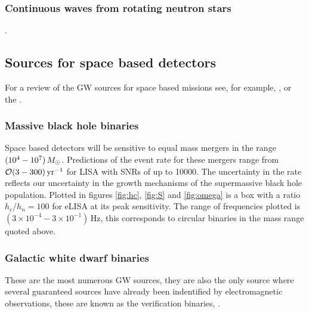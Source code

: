 \subsubsection{Continuous waves from rotating neutron stars}

{.


\subsection{Sources for space based detectors}
For a review of the GW sources for space based missions see, for example, \cite{Amaro-Seoane-et-al}, \cite{Gairetal} or the \cite{eLISAyellowbook}.


\subsubsection{Massive black hole binaries}
Space based detectors will be sensitive to equal mass mergers in the range $(10^{4}-10^{7})\,M_{ \odot }$. Predictions of the event rate for these mergers range from ${\cal{O}}(3-300)\,\textrm{yr}^{-1}$ for LISA with SNRs of up to 10000. The uncertainty in the rate reflects our uncertainty in the growth mechanisms of the supermassive black hole population. Plotted in figures \ref{fig:hc}, \ref{fig:S} and \ref{fig:omega} is a box with a ratio $h_{c}/h_{n}=100$ for eLISA at its peak sensitivity. The range of frequencies plotted is $(3\times 10^{-4}-3\times 10^{-1})\,\textrm{Hz}$, this corresponds to circular binaries in the mass range quoted above.

\subsubsection{Galactic white dwarf binaries} \label{sec:GB}
These are the most numerous GW sources, they are also the only source where several guaranteed sources have already been indentified by electromagnetic observations, these are known as the verification binaries, \cite{2006CQGra..23S.809S}.

}
